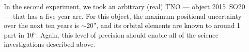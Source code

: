 In the second experiment, we took an arbitrary
(real) TNO --- object 2015~SO20 ---
that has a five year arc.
For this object, the maximum positional uncertainty
over the next ten years is $\sim$20'', and its orbital
elements are known to
around 1 part in 10$^5$. Again, this level
of precision should enable all of the science
investigations described above.


%
%
%
%
%
%
%
%
%
%
%
%
%
%
